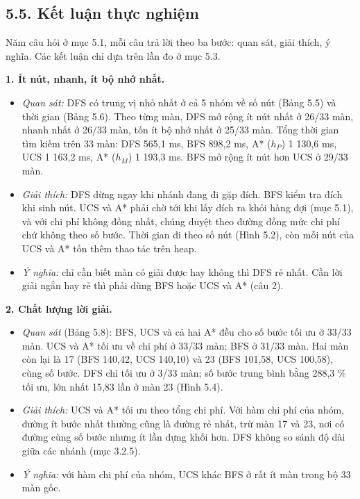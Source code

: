 \subsection{5.5. Kết luận thực nghiệm}

Năm câu hỏi ở mục 5.1, mỗi câu trả lời theo ba bước: quan sát, giải thích, ý nghĩa. Các kết luận chỉ dựa trên lần đo ở mục 5.3.

\textbf{1. Ít nút, nhanh, ít bộ nhớ nhất.}

\begin{itemize}
\tightlist
\item
  \emph{Quan sát:} DFS có trung vị nhỏ nhất ở cả 5 nhóm về số nút (Bảng 5.5) và thời gian (Bảng 5.6). Theo từng màn, DFS mở rộng ít nút nhất ở 26/33 màn, nhanh nhất ở 26/33 màn, tốn ít bộ nhớ nhất ở 25/33 màn. Tổng thời gian tìm kiếm trên 33 màn: DFS 565,1 ms, BFS 898,2 ms, A* (\(h_P\)) 1 130,6 ms, UCS 1 163,2 ms, A* (\(h_M\)) 1 193,3 ms. BFS mở rộng ít nút hơn UCS ở 29/33 màn.
\item
  \emph{Giải thích:} DFS dừng ngay khi nhánh đang đi gặp đích. BFS kiểm tra đích khi sinh nút. UCS và A* phải chờ tới khi lấy đích ra khỏi hàng đợi (mục 5.1), và với chi phí không đồng nhất, chúng duyệt theo đường đồng mức chi phí chứ không theo số bước. Thời gian đi theo số nút (Hình 5.2), còn mỗi nút của UCS và A* tốn thêm thao tác trên heap.
\item
  \emph{Ý nghĩa:} chỉ cần biết màn có giải được hay không thì DFS rẻ nhất. Cần lời giải ngắn hay rẻ thì phải dùng BFS hoặc UCS và A* (câu 2).
\end{itemize}

\textbf{2. Chất lượng lời giải.}

\begin{itemize}
\tightlist
\item
  \emph{Quan sát} (Bảng 5.8): BFS, UCS và cả hai A* đều cho số bước tối ưu ở 33/33 màn. UCS và A* tối ưu về chi phí ở 33/33 màn; BFS ở 31/33 màn. Hai màn còn lại là 17 (BFS 140,42, UCS 140,10) và 23 (BFS 101,58, UCS 100,58), cùng số bước. DFS chỉ tối ưu ở 3/33 màn; số bước trung bình bằng 288,3 \% tối ưu, lớn nhất 15,83 lần ở màn 23 (Hình 5.4).
\item
  \emph{Giải thích:} UCS và A* tối ưu theo tổng chi phí. Với hàm chi phí của nhóm, đường ít bước nhất thường cũng là đường rẻ nhất, trừ màn 17 và 23, nơi có đường cùng số bước nhưng ít lần dựng khối hơn. DFS không so sánh độ dài giữa các nhánh (mục 3.2.5).
\item
  \emph{Ý nghĩa:} với hàm chi phí của nhóm, UCS khác BFS ở rất ít màn trong bộ 33 màn gốc.
\end{itemize}

